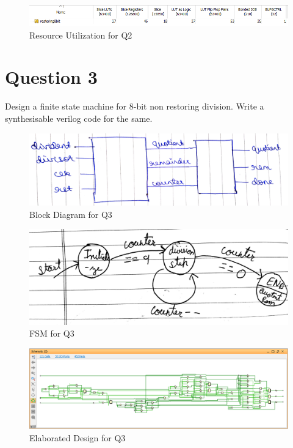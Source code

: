 \documentclass[11pt,a4paper]{article}
\begin{document}
	 \begin{figure}[H]
	 	\centering
	 	\includegraphics[width=1\linewidth]{images/q2utilization}
	 	\caption[]{Resource Utilization for Q2}
	 	\label{fig:q2utilization}
	 \end{figure}
	 
	  \section*{Question 3}
	 Design a finite state machine for 8-bit non restoring division. Write a synthesisable verilog code for the same. 
	 \begin{figure}[H]
	 	\centering
	 	\includegraphics[width=1\linewidth]{images/q2blockdiag}
	 	\caption[]{Block Diagram for Q3}
	 	\label{fig:q3blck}
	 \end{figure}
	 	\begin{figure}[H]
	 	\centering
	 	\includegraphics[scale=0.1]{images/q2fsm}
	 	\caption[]{FSM for Q3}
	 	\label{fig:q3fsm}
	 \end{figure}
	 
	 \begin{figure}[H]
	 	\centering
	 	\includegraphics[width=1\linewidth]{images/q3elaborated}
	 	\caption[]{Elaborated Design for Q3}
	 	\label{fig:q3elaborated}
	 \end{figure}
\end{document}
